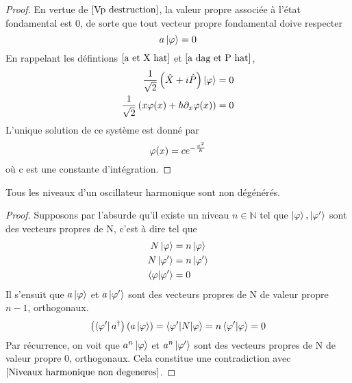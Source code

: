 \documentclass[../Notesdecours.tex]{subfiles}
\begin{document}
\begin{proof}
    En vertue de $\ref{Vp destruction}$, la valeur propre associée à l'état fondamental est 0, de sorte que tout vecteur propre fondamental doive respecter 
    \begin{equation}
        a\ket{\varphi} = 0
    \end{equation}
    En rappelant les défintions $\eqref{a et X hat}$ et $\eqref{a dag et P hat}$, 
    \begin{align*}
        \frac{1}{\sqrt{2}}\left(\hat{X}+i\hat{P}\right)\ket{\varphi} &= 0\\
        \frac{1}{\sqrt{2}}\left(x\varphi(x)+\hbar\partial_x \varphi(x)\right) &= 0
    \end{align*}
    L'unique solution de ce système est donné par 
    \begin{equation}
        \varphi(x) = ce^{-\frac{x^2}{\hbar}}
    \end{equation}
    où c est une constante d'intégration.
\end{proof}

\begin{Property}
    Tous les niveaux d'un oscillateur harmonique sont non dégénérés.
\end{Property}
\begin{proof}
    Supposons par l'absurde qu'il existe un niveau $n\in\mathbb{N}$ tel que $\ket{\varphi},\ket{\varphi'}$ sont des vecteurs propres de N, c'est à dire tel que 
    \begin{align}
        N\ket{\varphi} &= n\ket{\varphi}\\
        N\ket{\varphi'} &= n\ket{\varphi'}\\
        \braket{\varphi|\varphi'} &= 0
    \end{align}
    Il s'ensuit que $a\ket{\varphi}$ et $a\ket{\varphi'}$ sont des vecteurs propres de N de valeur propre $n-1$, orthogonaux.
    \begin{equation*}
        \left(\bra{\varphi'}a^\dagger\right)\left(a\ket{\varphi}\right) = \braket{\varphi'|N|\varphi} = n\braket{\varphi'|\varphi} = 0
    \end{equation*}
    Par récurrence, on voit que $a^n\ket{\varphi}$ et $a^n\ket{\varphi'}$ sont des vecteurs propres de N de valeur propre 0, orthogonaux. Cela constitue une contradiction avec $\ref{Niveaux harmonique non degeneres}$.
\end{proof}
\end{document}
